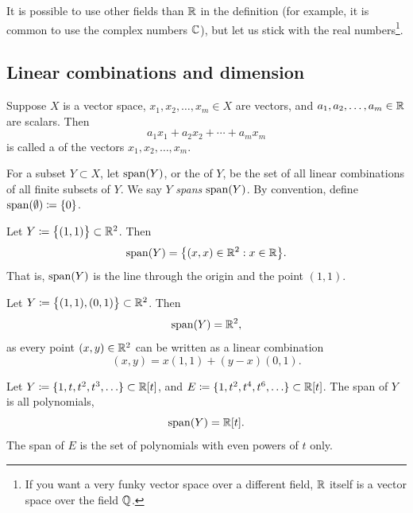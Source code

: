 It is possible to use other fields than ${\mathbb{R}}$ in the definition
(for example, it is common to use the complex numbers ${\mathbb{C}}$),
but let us stick with
the real numbers\footnote{If you want a very funky vector space over a different field,
${\mathbb{R}}$ itself is a vector space over the field ${\mathbb{Q}}$.}.

\subsection{Linear combinations and dimension}

\begin{defn}
Suppose $X$ is a vector space,
$x_1, x_2, \ldots, x_m \in X$ are vectors, and
$a_1, a_2, \ldots, a_m \in {\mathbb{R}}$ are scalars.  Then
\begin{equation*}
a_1 x_1 + 
a_2 x_2 +  \cdots
+ a_m x_m
\end{equation*}
is called a \emph{} of the vectors $x_1, x_2,
\ldots, x_m$.

For a subset $Y \subset X$, let $\operatorname{span}(Y)$,
or the \emph{} of $Y$,
be the set of all linear combinations of all finite subsets of $Y$.
We say $Y$ \emph{spans} $\operatorname{span}(Y)$.
By convention, define $\operatorname{span}(\emptyset) \coloneqq \{ 0 \}$.
\end{defn}

\begin{example}
Let $Y \coloneqq \bigl\{ (1,1) \bigr\} \subset {\mathbb{R}}^2$.  Then
\begin{equation*}
\operatorname{span}(Y)
=
\bigl\{ (x,x) \in {\mathbb{R}}^2 : x \in {\mathbb{R}} \bigr\} .
\end{equation*}
That is, $\operatorname{span}(Y)$ is the line through the origin and the point $(1,1)$.
\end{example}

\begin{example} \label{example:vecspr2span}
Let $Y \coloneqq \bigl\{ (1,1), (0,1) \bigr\} \subset {\mathbb{R}}^2$.  Then
\begin{equation*}
\operatorname{span}(Y)
=
{\mathbb{R}}^2 ,
\end{equation*}
as every point $(x,y) \in {\mathbb{R}}^2$ can be written as
a linear combination
\begin{equation*}
(x,y) = x (1,1) + (y-x) (0,1) .
\end{equation*}
\end{example}

\begin{example}
Let $Y \coloneqq \{ 1, t, t^2, t^3, \ldots \} \subset {\mathbb{R}}[t]$, and
$E \coloneqq \{ 1, t^2, t^4, t^6, \ldots \} \subset {\mathbb{R}}[t]$.
The span of $Y$ is all polynomials,
\begin{equation*}
\operatorname{span}(Y) = {\mathbb{R}}[t] .
\end{equation*}
The span of $E$ is the set of polynomials with even powers of $t$ only.
\end{example}

